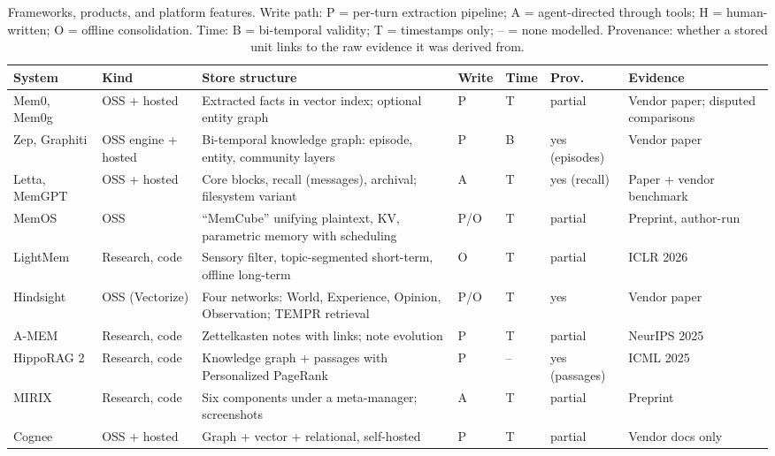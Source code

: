 \documentclass[11pt]{article}
\begin{document}
\begin{table}[tp]
\centering\scriptsize
\caption{Frameworks, products, and platform features. Write path: P = per-turn extraction pipeline; A = agent-directed through tools; H = human-written; O = offline consolidation. Time: B = bi-temporal validity; T = timestamps only; -- = none modelled. Provenance: whether a stored unit links to the raw evidence it was derived from.}
\label{tab:resources}
\begin{tabularx}{\textwidth}{L{2.2cm} L{1.5cm} X L{0.9cm} L{0.85cm} L{1.3cm} L{2.2cm}}
\toprule
\textbf{System} & \textbf{Kind} & \textbf{Store structure} & \textbf{Write} & \textbf{Time} & \textbf{Prov.} & \textbf{Evidence} \\
\midrule
Mem0, Mem0g \citep{chhikara2025mem0} & OSS + hosted & Extracted facts in vector index; optional entity graph & P & T & partial & Vendor paper; disputed comparisons \\
Zep, Graphiti \citep{rasmussen2025zep} & OSS engine + hosted & Bi-temporal knowledge graph: episode, entity, community layers & P & B & yes (episodes) & Vendor paper \\
Letta, MemGPT \citep{packer2023memgpt,letta2025filesystem} & OSS + hosted & Core blocks, recall (messages), archival; filesystem variant & A & T & yes (recall) & Paper + vendor benchmark \\
MemOS \citep{li2025memos} & OSS & ``MemCube'' unifying plaintext, KV, parametric memory with scheduling & P/O & T & partial & Preprint, author-run \\
LightMem \citep{fang2025lightmem} & Research, code & Sensory filter, topic-segmented short-term, offline long-term & O & T & partial & ICLR 2026 \\
Hindsight \citep{latimer2025hindsight} & OSS (Vectorize) & Four networks: World, Experience, Opinion, Observation; TEMPR retrieval & P/O & T & yes & Vendor paper \\
A-MEM \citep{xu2025amem} & Research, code & Zettelkasten notes with links; note evolution & P & T & partial & NeurIPS 2025 \\
HippoRAG 2 \citep{gutierrez2025hipporag2} & Research, code & Knowledge graph + passages with Personalized PageRank & P & -- & yes (passages) & ICML 2025 \\
MIRIX \citep{wang2025mirix} & Research, code & Six components under a meta-manager; screenshots & A & T & partial & Preprint \\
Cognee \citep{cognee2026} & OSS + hosted & Graph + vector + relational, self-hosted & P & T & partial & Vendor docs only \\

\end{tabularx}
\end{table}
\end{document}
